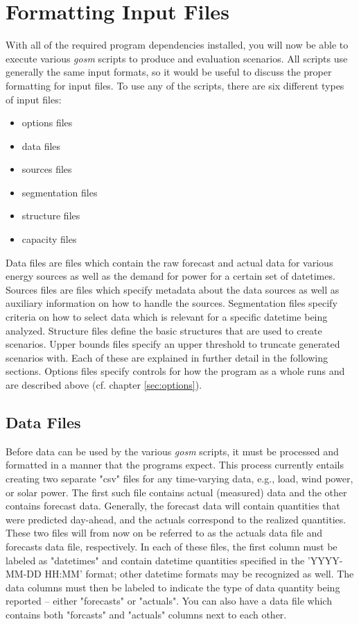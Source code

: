 \documentclass[11pt]{article}
\begin{document}
\vspace{50mm}

\section{Formatting Input Files}

With all of the required program dependencies installed, you will now be able to execute various \textit{gosm} scripts to produce and evaluation scenarios. All scripts use generally the same input formats, so it would be useful
to discuss the proper formatting for input files. To use any of the scripts, there are six different types of input files:
\begin{itemize}
	\item options files
	\item data files
	\item sources files
	\item segmentation files
	\item structure files
	\item capacity files
\end{itemize}

Data files are files which contain the raw forecast and actual data for various energy sources as well as the demand for power for a certain set of datetimes.
Sources files are files which specify metadata about the data sources as well as auxiliary information on how to handle the sources.
Segmentation files specify criteria on how to select data which is relevant for a specific datetime being analyzed.
Structure files define the basic structures that are used to create scenarios. Upper bounds files specify an upper threshold to truncate generated scenarios with.
Each of these are explained in further detail in the following sections.
Options files specify controls for how the program as a whole runs and are described above (cf. chapter \ref{sec:options}).

\subsection{Data Files}
Before data can be used by the various \textit{gosm} scripts, it must be processed and formatted in a manner that the programs expect. This process currently entails creating two separate "csv" files for any time-varying data, e.g., load, wind power, or solar power. The first such file contains actual (measured) data and the other contains forecast data. Generally, the forecast data will contain quantities that were predicted day-ahead, and the actuals correspond to the realized quantities. These two files will from now on be referred to as the actuals data file and forecasts data file, respectively. In each of these files, the first column must be labeled as "datetimes" and contain datetime quantities specified in the 'YYYY-MM-DD HH:MM' format; other datetime formats may be recognized as well. The data columns must then be labeled to indicate the type of data quantity being reported -- either "forecasts" or "actuals". You can also have a data file which contains both "forcasts" and "actuals" columns next to each other.
\end{document}
